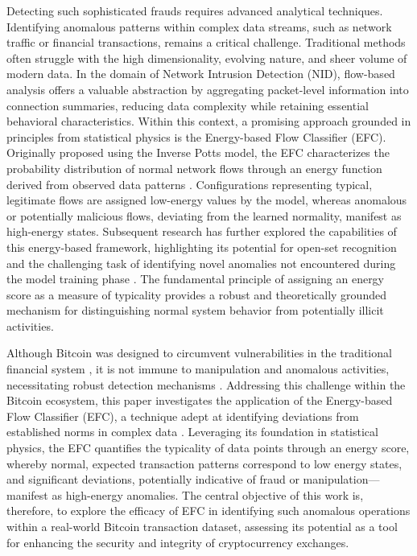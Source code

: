 \documentclass[12pt]{article}
\begin{document}
Detecting such sophisticated frauds requires advanced analytical techniques. Identifying anomalous patterns within complex
data streams, such as network traffic or financial transactions, remains a
critical challenge. Traditional methods often struggle with the high dimensionality, evolving nature, and sheer volume
of modern data. In the domain of Network Intrusion Detection (NID), flow-based analysis offers a valuable abstraction by
aggregating packet-level information into connection summaries, reducing data complexity while retaining essential
behavioral characteristics. Within this context, a promising approach grounded in principles from statistical physics
is the Energy-based Flow Classifier (EFC). Originally proposed using the Inverse Potts model, the EFC characterizes the
probability distribution of normal network flows through an energy function derived from observed data patterns
\cite{pontes2019}. Configurations representing typical, legitimate flows are assigned low-energy values by the model,
whereas anomalous or potentially malicious flows, deviating from the learned normality, manifest as high-energy states.
Subsequent research has further explored the capabilities of this energy-based framework, highlighting its potential for
open-set recognition and the challenging task of identifying novel anomalies not encountered during the model training
phase \cite{souza2022novelopensetenergybased}. The fundamental principle of assigning an energy score as a measure of
typicality provides a robust and theoretically grounded mechanism for distinguishing normal system behavior from potentially
illicit activities.

Although Bitcoin was designed to circumvent vulnerabilities in the traditional financial system \cite{nakamoto2008bitcoin},
it is not immune to manipulation and anomalous activities, necessitating robust detection mechanisms \cite{zhang2020financial,
zainal2018review}. Addressing this challenge within the Bitcoin ecosystem, this paper investigates the application of the
Energy-based Flow Classifier (EFC), a technique adept at identifying deviations from established norms in complex data
\cite{pontes2019, souza2022novelopensetenergybased}. Leveraging its foundation in statistical physics, the EFC quantifies
the typicality of data points through an energy score, whereby normal, expected transaction patterns correspond to low
energy states, and significant deviations, potentially indicative of fraud or manipulation—manifest as high-energy
anomalies. The central objective of this work is, therefore, to explore the efficacy of EFC in identifying such anomalous
operations within a real-world Bitcoin transaction dataset, assessing its potential as a tool for enhancing the security
and integrity of cryptocurrency exchanges.
\end{document}

